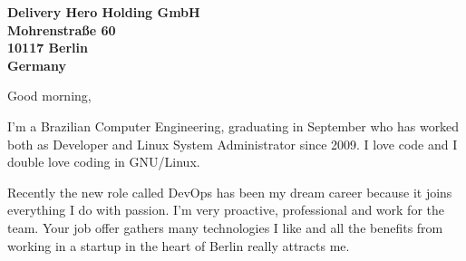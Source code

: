 \documentclass[a4paper]{willianpaixao-resume}
\begin{document}
\begin{letter}{\bfseries
Delivery Hero Holding GmbH\\Mohrenstraße 60\\10117 Berlin\\Germany}
\opening{Good morning,}

I'm a Brazilian Computer Engineering, graduating in September who has worked
both as Developer and Linux System Administrator since 2009. I love code and I
double love coding in GNU/Linux.

Recently the new role called DevOps has been my dream career because it joins
everything I do with passion. I'm very proactive, professional and work for the
team. Your job offer gathers many technologies I like and all the benefits from
working in a startup in the heart of Berlin really attracts me.





\end{letter}
\end{document}

